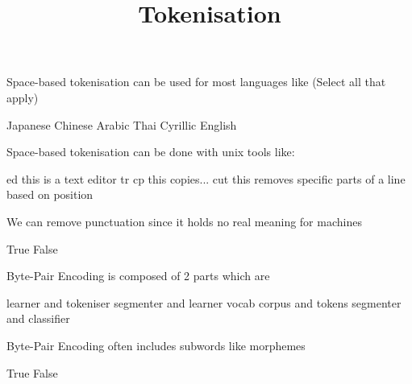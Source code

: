 \documentclass[theme=sleek, randomorder, hidesidemenu]{webquiz}
\title{Tokenisation}
\begin{document}
\begin{question}

  Space-based tokenisation can be used for most languages like (Select all that apply)

  \begin{choice}[multiple, columns=2]
    \incorrect Japanese
    \incorrect Chinese
    \correct Arabic
    \incorrect Thai
    \correct Cyrillic
    \correct English
  \end{choice}

\end{question}

\begin{question}

  Space-based tokenisation can be done with unix tools like:

  \begin{choice}[columns=2]
    \incorrect ed \feedback this is a text editor
    \correct tr
    \incorrect cp \feedback this copies...
    \incorrect cut \feedback this removes specific parts of a line based on position
  \end{choice}

\end{question}

\begin{question}

  We can remove punctuation since it holds no real meaning for machines

  \begin{choice}[columns=2]
    \incorrect True
    \correct False
  \end{choice}

\end{question}

\begin{question}

  Byte-Pair Encoding is composed of 2 parts which are

  \begin{choice}[columns=2]
    \incorrect learner and tokeniser
    \correct segmenter and learner
    \incorrect vocab corpus and tokens
    \incorrect segmenter and classifier
  \end{choice}

\end{question}

\begin{question}

  Byte-Pair Encoding often includes subwords like morphemes

  \begin{choice}[columns=2]
    \correct True
    \incorrect False
  \end{choice}

\end{question}
\end{document}
